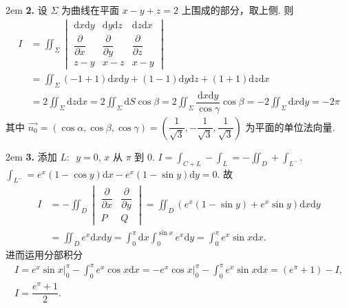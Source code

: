 \documentclass[UTF8,14pt,normal]{ctexart}
\begin{document}
    \hangindent 2em
    \noindent
    \textbf{2.}
    设 \(\Sigma\) 为曲线在平面 \(x - y + z = 2\) 上围成的部分，取上侧. 则
    \begin{align*}
        I & = \iint_\Sigma \begin{vmatrix}
            \mathrm{d} x \mathrm{d} y & \mathrm{d} y \mathrm{d} z & \mathrm{d} z \mathrm{d} x \\
            \dfrac{\partial}{\partial x} & \dfrac{\partial}{\partial y} & \dfrac{\partial}{\partial z} \\
            z - y & x - z & x - y
        \end{vmatrix} \\
        & = \iint_\Sigma (-1 + 1) \mathrm{d} x \mathrm{d} y + (1 - 1) \mathrm{d} y \mathrm{d} z + (1 + 1) \mathrm{d} z \mathrm{d} x \\ & = 2 \iint_\Sigma \mathrm{d} z \mathrm{d} x = 2 \iint_\Sigma \mathrm{d} S \cos \beta = 2 \iint_\Sigma \dfrac{\mathrm{d} x \mathrm{d} y}{\cos \gamma} \cos \beta = -2 \iint_\Sigma \mathrm{d} x \mathrm{d} y = -2\pi 
    \end{align*}
    其中 \(\vec{n_0} = (\cos \alpha, \cos \beta, \cos \gamma) = (\dfrac{1}{\sqrt{3}}, -\dfrac{1}{\sqrt{3}}, \dfrac{1}{\sqrt{3}})\) 为平面的单位法向量.

    \hangindent 2em
    \noindent
    \textbf{3.} 添加 \(L: \enspace y = 0\), \(x\) 从 \(\pi\) 到 \(0\). \(I = \int_{C + L} - \int_{L} = - \iint_D + \int_{L^-}\). \\ \(\int_{L^-} = e^x(1 - \cos y) \mathrm{d} x - e^x(1 - \sin y) \mathrm{d} y = 0\). 故 
    \begin{align*}
        I & = - \iint_D \begin{vmatrix}
            \dfrac{\partial}{\partial x} & \dfrac{\partial}{\partial y} \\
            P & Q
        \end{vmatrix}= \iint_D (e^x(1 - \sin y) + e^x \sin y) \mathrm{d} x \mathrm{d} y \\ & = \iint_D e^x \mathrm{d} x \mathrm{d} y = \int_{0}^{\pi} \mathrm{d} x \int_{0}^{\sin x} e^x \mathrm{d} y = \int_{0}^{\pi} e^x \sin x \mathrm{d} x. 
    \end{align*}
    进而运用分部积分
    \begin{gather*}
        I = e^x \sin x \bigg|_{0}^{\pi} - \int_{0}^{\pi} e^x \cos x \mathrm{d} x = - e^x \cos x \bigg|_{0}^{\pi} - \int_{0}^{\pi} e^x \sin x \mathrm{d} x = (e^\pi + 1) - I, \\
        I = \dfrac{e^\pi + 1}{2}.
    \end{gather*}
\end{document}
